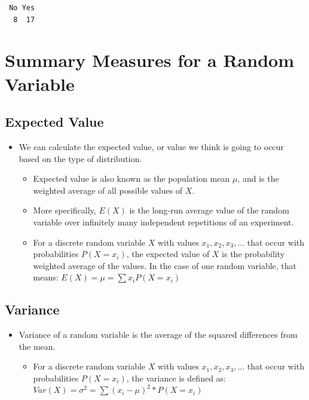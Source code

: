 \documentclass[
  letterpaper,
  DIV=11,
  numbers=noendperiod]{scrreprt}
\providecommand{\tightlist}{%
  \setlength{\itemsep}{0pt}\setlength{\parskip}{0pt}}\usepackage{longtable,booktabs,array}
\begin{document}
\begin{verbatim}
 No Yes 
  8  17 
\end{verbatim}

\section{Summary Measures for a Random
Variable}\label{summary-measures-for-a-random-variable}

\subsection{Expected Value}\label{expected-value}

\begin{itemize}
\tightlist
\item
  We can calculate the expected value, or value we think is going to
  occur based on the type of distribution.

  \begin{itemize}
  \tightlist
  \item
    Expected value is also known as the population mean \(\mu\), and is
    the weighted average of all possible values of \(X\).
  \item
    More specifically, \(E(X)\) is the long-run average value of the
    random variable over infinitely many independent repetitions of an
    experiment.
  \item
    For a discrete random variable \(X\) with values
    \(x_1, x_2, x_3, ...\) that occur with probabilities \(P(X=x_i)\),
    the expected value of \(X\) is the probability weighted average of
    the values. In the case of one random variable, that means:
    \(E(X) = \mu = \sum{x_iP(X=x_i)}\)
  \end{itemize}
\end{itemize}

\subsection{Variance}\label{variance}

\begin{itemize}
\tightlist
\item
  Variance of a random variable is the average of the squared
  differences from the mean.

  \begin{itemize}
  \tightlist
  \item
    For a discrete random variable \(X\) with values
    \(x_1, x_2, x_3, ...\) that occur with probabilities \(P(X=x_i)\),
    the variance is defined as:
    \(Var(X) = \sigma^2 = \sum{(x_i-\mu)^2*P(X=x_i)}\)
  \end{itemize}
\end{itemize}
\end{document}
